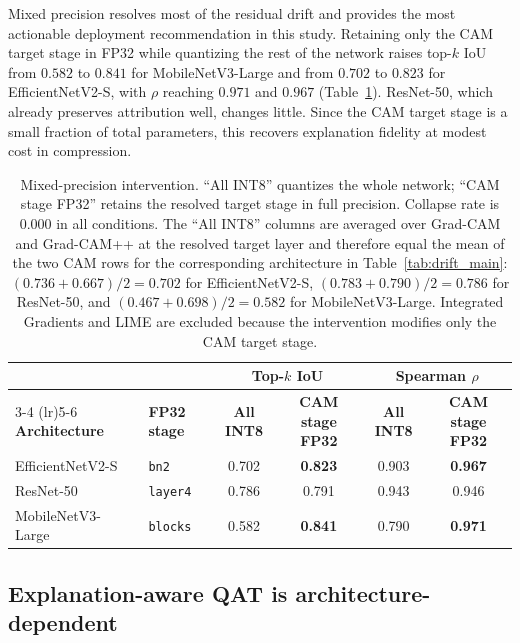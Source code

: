 \documentclass[fleqn,10pt]{wlscirep}
\begin{document}
Mixed precision resolves most of the residual drift and provides the most actionable deployment recommendation in this study. Retaining only the CAM target stage in FP32 while quantizing the rest of the network raises top-$k$ IoU from $0.582$ to $0.841$ for MobileNetV3-Large and from $0.702$ to $0.823$ for EfficientNetV2-S, with $\rho$ reaching $0.971$ and $0.967$ (Table~\ref{tab:mixed_precision}). ResNet-50, which already preserves attribution well, changes little. Since the CAM target stage is a small fraction of total parameters, this recovers explanation fidelity at modest cost in compression.

\begin{table}[!ht]
\centering
\scriptsize
\caption{Mixed-precision intervention. ``All INT8'' quantizes the whole network; ``CAM stage FP32'' retains the resolved target stage in full precision. Collapse rate is $0.000$ in all conditions. The ``All INT8'' columns are averaged over Grad-CAM and Grad-CAM++ at the resolved target layer and therefore equal the mean of the two CAM rows for the corresponding architecture in Table~\ref{tab:drift_main}: $(0.736+0.667)/2 = 0.702$ for EfficientNetV2-S, $(0.783+0.790)/2 = 0.786$ for ResNet-50, and $(0.467+0.698)/2 = 0.582$ for MobileNetV3-Large. Integrated Gradients and LIME are excluded because the intervention modifies only the CAM target stage.}
\label{tab:mixed_precision}
\setlength{\tabcolsep}{5pt}
\begin{tabular}{ll cc cc}
\toprule
 & & \multicolumn{2}{c}{\textbf{Top-$k$ IoU}} & \multicolumn{2}{c}{\textbf{Spearman $\rho$}} \\
\cmidrule(lr){3-4} \cmidrule(lr){5-6}
\textbf{Architecture} & \textbf{FP32 stage} & \textbf{All INT8} & \textbf{CAM stage FP32} & \textbf{All INT8} & \textbf{CAM stage FP32} \\
\midrule
EfficientNetV2-S  & \texttt{bn2}   & 0.702 & \textbf{0.823} & 0.903 & \textbf{0.967} \\
ResNet-50         & \texttt{layer4} & 0.786 & 0.791 & 0.943 & 0.946 \\
MobileNetV3-Large & \texttt{blocks} & 0.582 & \textbf{0.841} & 0.790 & \textbf{0.971} \\
\bottomrule
\end{tabular}
\end{table}

\subsection*{Explanation-aware QAT is architecture-dependent}
\end{document}
